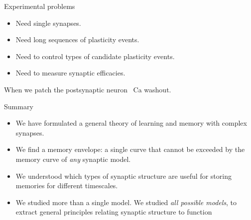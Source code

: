 \documentclass[final]{beamer}%
\begin{document}
\begin{frame}{Experimental problems}
%
 \begin{itemize}
   \item Need single synapses.
   \item Need long sequences of plasticity events.
   \item Need to control types of candidate plasticity events.
   \item Need to measure synaptic efficacies.
 \end{itemize}

 \vp When we patch the postsynaptic neuron \lto\ Ca washout.
%
\end{frame}


\begin{frame}{Summary}
%
  \begin{itemize}
    \item We have formulated a general theory of learning and memory with complex synapses.
    \vp\item We find a memory envelope: a single curve that cannot be exceeded by the memory curve of \emph{any} synaptic model.
    \vp\item We understood which types of synaptic structure are useful for storing memories for different timescales.
    \vp\item We studied more than a single model. We studied \emph{all possible models}, to extract general principles relating synaptic structure to function
  \end{itemize}

%
\end{frame}
\end{document}
